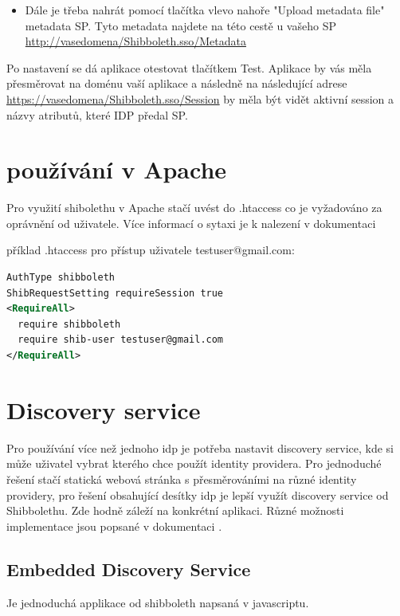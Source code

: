 \begin{itemize}
    \item Dále je třeba nahrát pomocí tlačítka vlevo nahoře "Upload metadata file" metadata SP. Tyto metadata najdete na této cestě u vašeho SP \url{http://vasedomena/Shibboleth.sso/Metadata}

\end{itemize}

Po nastavení se dá aplikace otestovat tlačítkem Test. Aplikace by vás měla přesměrovat na doménu vaší aplikace a následně na následující adrese \url{https://vasedomena/Shibboleth.sso/Session} by měla být vidět aktivní session a názvy atributů, které IDP předal SP.

\section{používání v Apache}

Pro využití shibolethu v Apache stačí uvést do .htaccess co je vyžadováno za oprávnění od uživatele. Více informací o sytaxi je k nalezení v dokumentaci\cite{SPApache}\cite{SPhtaccess} \linebreak

příklad .htaccess pro přístup uživatele testuser@gmail.com:

 \begin{lstlisting}[language=XML]
    AuthType shibboleth
ShibRequestSetting requireSession true
<RequireAll>
  require shibboleth
  require shib-user testuser@gmail.com
</RequireAll>
    \end{lstlisting}


\section{Discovery service}
Pro používání více než jednoho idp je potřeba nastavit discovery service, kde si může uživatel vybrat kterého chce použít identity providera. Pro jednoduché řešení stačí statická webová stránka s přesměrováními na různé identity providery, pro řešení obsahující desítky idp je lepší využít discovery service od Shibbolethu. Zde hodně záleží na konkrétní aplikaci. Různé možnosti implementace jsou popsané v dokumentaci \cite{IdPDiscovery}.

\subsection{Embedded Discovery Service}
Je jednoduchá applikace od shibboleth napsaná v javascriptu. 

